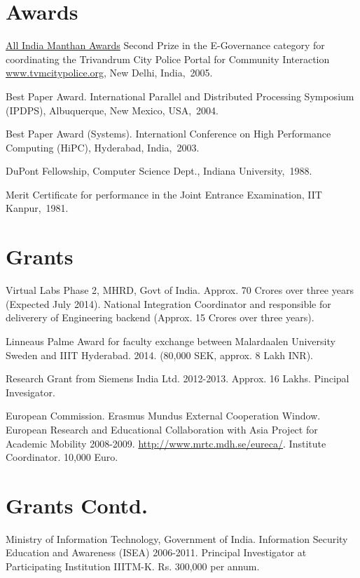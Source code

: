 \documentclass[11pt,margin,line]{res}
\begin{document}
\begin{resume}
\section{\sc Awards}

\href{http://www.manthanaward.com/winner2005.asp}{All India
Manthan Awards} Second Prize in the E-Governance category
for coordinating the Trivandrum City Police Portal for
Community Interaction \url{www.tvmcitypolice.org}, New
Delhi, India,~2005.

Best Paper Award. International Parallel and Distributed
Processing Symposium (IPDPS), Albuquerque, New Mexico,
USA,~2004.


Best Paper Award  (Systems). Internationl Conference on High
Performance Computing (HiPC), Hyderabad, India,~2003.

DuPont Fellowship, Computer Science Dept., Indiana
University,~1988.

Merit Certificate for performance in the Joint Entrance
Examination, IIT Kanpur,~1981.


\section{\sc Grants}

Virtual Labs Phase 2, MHRD, Govt of India.  Approx. 70
Crores over three years (Expected July 2014).  National
Integration Coordinator and responsible for deliverery of
Engineering backend (Approx. 15 Crores over three years).

Linneaus Palme Award for faculty exchange between
Malardaalen University Sweden and IIIT Hyderabad.  2014.
(80,000 SEK, approx.  8 Lakh INR).

Research Grant from Siemens India Ltd.  2012-2013.
Approx. 16 Lakhs.  Pincipal Invesigator.

European Commission.  Erasmus Mundus External Cooperation
Window. European Research and Educational Collaboration with
Asia Project for Academic Mobility 2008-2009.
\url{http://www.mrtc.mdh.se/eureca/}.  Institute
Coordinator.  10,000 Euro.

\newpage

\section{\sc Grants Contd.}
Ministry of Information Technology, Government of India.
Information Security Education and Awareness (ISEA)
2006-2011.  Principal Investigator at Participating
Institution IIITM-K.  Rs. 300,000 per annum. 


\end{resume}
\end{document}
